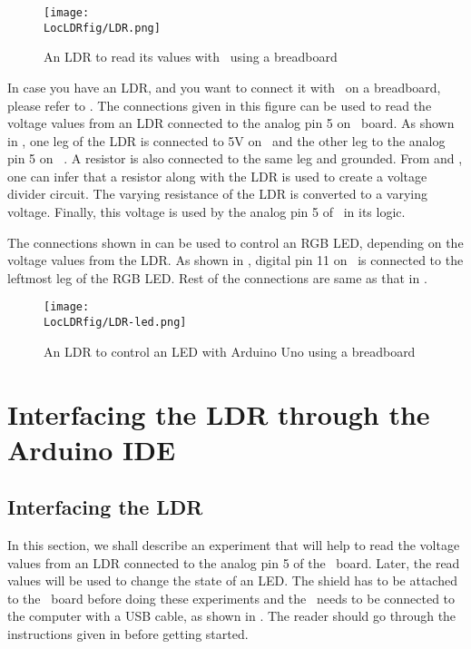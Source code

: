 \begin{figure}
  \centering
  \texttt{[image: \\LocLDRfig/LDR.png]}
  \caption{An LDR to read its values with \arduino\ using a breadboard}
  \label{fig:ard-ldr}
\end{figure}

In case you have an LDR, and you want to connect it with \arduino\ on a breadboard, 
please refer to . The connections given in this figure can be 
used to read the voltage values from an LDR connected to the analog pin 5 on 
\arduino\ board. As shown in , one leg of the LDR is connected 
to 5V on \arduino\ and the other leg to the analog pin 5 on  \arduino. A resistor is also connected to the same leg and grounded. 
From  and , one can infer that a resistor 
along with the LDR is used to create a voltage divider circuit. The varying 
resistance of the LDR is converted to a varying voltage. Finally, this voltage is used 
by the analog pin 5 of \arduino\ in its logic. 

The connections shown in  can be used to control an RGB LED, 
depending on the voltage values from the LDR. As shown in , 
digital pin 11 on \arduino\ is connected to the leftmost leg of the RGB LED. Rest of the connections
are same as that in . 

\begin{figure}
  \centering
  \texttt{[image: \\LocLDRfig/LDR-led.png]}
  \caption{An LDR to control an LED with Arduino Uno using a breadboard}
  \label{fig:ard-ldr-led}
\end{figure}


\section{Interfacing the LDR through the Arduino IDE}
\subsection{Interfacing the LDR}
In this section, we shall describe an experiment that will help 
to read the voltage values from an LDR connected to the analog pin 5 
of the \arduino\ board. Later, the read values will be used to change the state of an LED.  The shield has to be attached to the \arduino\ board
before doing these experiments and the \arduino\ needs to be connected to the computer 
with a USB cable, as shown in . The reader should go through the
instructions given in  before getting started.


